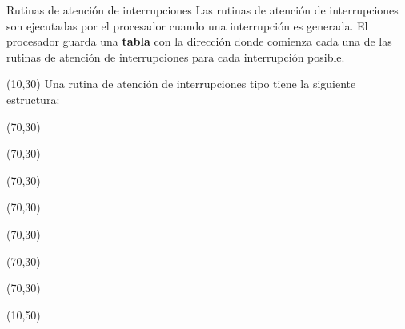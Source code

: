 \documentclass[aspectratio=169]{beamer}
\begin{document}
\begin{frame}[fragile,t]{Rutinas de atención de interrupciones}
    Las rutinas de atención de interrupciones son ejecutadas por el procesador cuando una interrupción es generada.
    El procesador guarda una \textbf{tabla} con la dirección donde comienza cada una de las rutinas de atención de interrupciones para cada interrupción posible.\\
    \begin{textblock}{50}(10,30)
    Una rutina de atención de interrupciones tipo tiene la siguiente estructura:
    \end{textblock}
    \begin{textblock}{70}(70,30)  \end{textblock}
    \begin{textblock}{70}(70,30)  \end{textblock}
    \begin{textblock}{70}(70,30)  \end{textblock}
    \begin{textblock}{70}(70,30)  \end{textblock}
    \begin{textblock}{70}(70,30)  \end{textblock}
    \begin{textblock}{70}(70,30)  \end{textblock}
    \begin{textblock}{70}(70,30)  \end{textblock}
    \begin{textblock}{50}(10,50)
    \end{textblock}
\end{frame}
\end{document}
